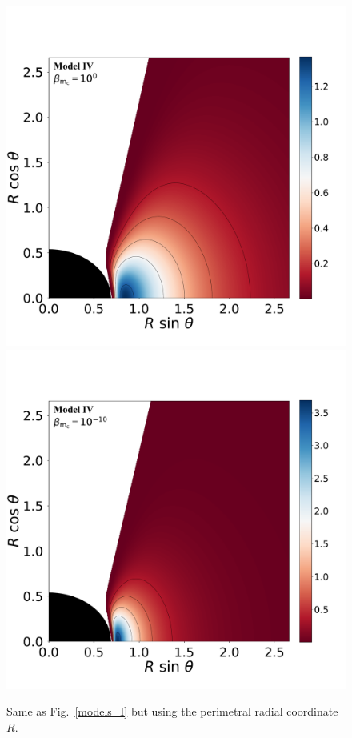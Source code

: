 \documentclass[twocolumn,aps,showpacs,showkeys,prd,superscriptaddress,byrevtex, amsmath]{revtex4-1}
\begin{document}
\begin{figure}
\hspace{-0.3cm}
\includegraphics[scale=0.14]{figures/fig3_IV_1.pdf}
\hspace{-0.2cm}
\includegraphics[scale=0.14]{figures/fig3_IV__10.pdf}
\hspace{-0.2cm}
\caption{Same as Fig.~\ref{models_I} but using the perimetral radial coordinate $R$.}
\label{models_peri_I}
\end{figure}
\end{document}
